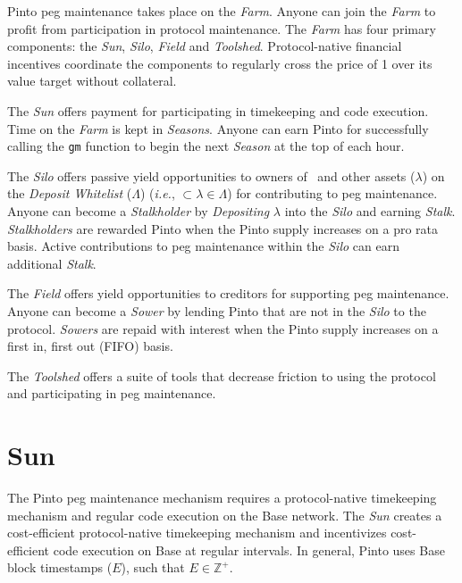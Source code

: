 \documentclass[tikz]{article}
\newcommand{\code}[1]{\texttt{#1}}
\newcommand{\term}[1]{\textsl{#1}}
\newcommand{\Pinto}{} %
\begin{document}
Pinto peg maintenance takes place on the \term{Farm}. Anyone can join the \term{Farm} to profit from participation in protocol maintenance. The \term{Farm} has four primary components: the \term{Sun}, \term{Silo}, \term{Field} and \term{Toolshed}. Protocol-native financial incentives coordinate the components to regularly cross the price of \Pinto1 over its value target without collateral.

The \term{Sun} offers payment for participating in timekeeping and code execution. Time on the \term{Farm} is kept in \term{Seasons}. Anyone can earn Pinto for successfully calling the \code{gm} function to begin the next \term{Season} at the top of each hour.

The \term{Silo} offers passive yield opportunities to owners of \Pinto\ and other assets ($\lambda$) on the \term{Deposit Whitelist} ($\Lambda$) (\textit{i.e.}, $\Pinto \subset \lambda \in \Lambda$) for contributing to peg maintenance. Anyone can become a \term{Stalkholder} by \term{Depositing} $\lambda$ into the \term{Silo} and earning \term{Stalk}. \term{Stalkholders} are rewarded Pinto when the Pinto supply increases on a pro rata basis. Active contributions to peg maintenance within the \term{Silo} can earn additional \term{Stalk}.

The \term{Field} offers yield opportunities to creditors for supporting peg maintenance. Anyone can become a \term{Sower} by lending Pinto that are not in the \term{Silo} to the protocol. \term{Sowers} are repaid with interest when the Pinto supply increases on a first in, first out (FIFO) basis. 

The \term{Toolshed} offers a suite of tools that decrease friction to using the protocol and participating in peg maintenance.


\section{Sun}

The Pinto peg maintenance mechanism requires a protocol-native timekeeping mechanism and regular code execution on the Base network. The \term{Sun} creates a cost-efficient protocol-native timekeeping mechanism and incentivizes cost-efficient code execution on Base at regular intervals. In general, Pinto uses Base block timestamps ($E$), such that $E \in \mathbb{Z}^{+}$.

\newpage
\end{document}
